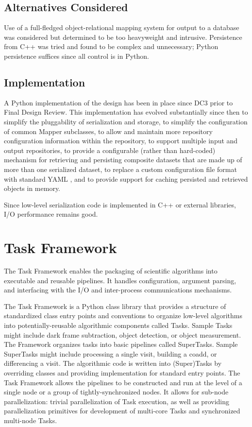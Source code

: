 \documentclass[DM,lsstdraft,toc]{lsstdoc}
\begin{document}
\subsection{Alternatives Considered}\label{alternatives-considered}

Use of a full-fledged object-relational mapping system for output to a
database was considered but determined to be too heavyweight and
intrusive. Persistence from C++ was tried and found to be complex and
unnecessary; Python persistence suffices since all control is in Python.

\subsection{Implementation}\label{butler-implementation}

A Python implementation of the design has been in place since DC3 prior to
Final Design Review.  This implementation has evolved substantially since then
to simplify the pluggability of serialization and storage, to simplify the
configuration of common Mapper subclasses, to allow and maintain more
repository configuration information within the repository, to support multiple
input and output repositories, to provide a configurable (rather than
hard-coded) mechanism for retrieving and persisting composite datasets that are
made up of more than one serialized dataset, to replace a custom configuration
file format with standard YAML \citep{YAML}, and to provide support for caching
persisted and retrieved objects in memory.

Since low-level serialization code is implemented in C++ or external libraries,
I/O performance remains good.


\section{Task Framework}\label{task-framework}

The Task Framework enables the packaging of scientific algorithms into
executable and reusable pipelines. It handles configuration, argument parsing,
and interfacing with the I/O and inter-process communications mechanisms.

The Task Framework is a Python class library that provides a structure of
standardized class entry points and conventions to organize low-level
algorithms into potentially-reusable algorithmic components called Tasks.
Sample Tasks might include dark frame subtraction, object detection, or object
measurement.  The Framework organizes tasks into basic pipelines called
SuperTasks.  Sample SuperTasks might include processing a single visit,
building a coadd, or differencing a visit. The algorithmic code is written into
(Super)Tasks by overriding classes and providing implementation for standard
entry points. The Task Framework allows the pipelines to be constructed and run
at the level of a single node or a group of tightly-synchronized nodes. It
allows for sub-node parallelization: trivial parallelization of Task execution,
as well as providing parallelization primitives for development of multi-core
Tasks and synchronized multi-node Tasks.
\end{document}
